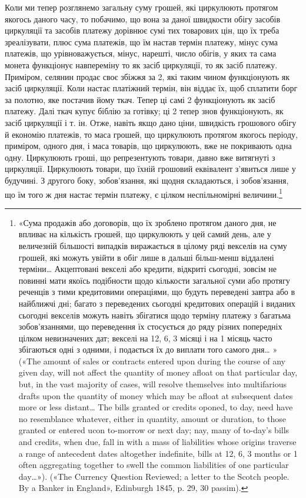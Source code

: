 Коли ми тепер розглянемо загальну суму грошей, які циркулюють протягом якогось даного часу, то
побачимо, що вона за даної швидкости обігу засобів циркуляції та засобів платежу дорівнює сумі тих
товарових цін, що їх треба зреалізувати, плюс сума платежів, що їм настав термін платежу, мінус сума
платежів, що урівноважується, мінус, нарешті, число обігів, у яких та сама монета функціонує
навпереміну то як засіб циркуляції, то як засіб платежу. Приміром, селянин продає своє збіжжя за 2, які таким чином функціонують як засіб циркуляції. Коли настає платіжний термін,
він віддає їх, щоб сплатити борг за полотно, яке постачив йому ткач. Тепер ці самі 2 функціонують як засіб платежу. Далі ткач купує біблію за готівку; ці 2
тепер знов функціонують,
як засіб циркуляції і т. ін. Отже, навіть якщо дано ціни, швидкість грошового обігу й
економію платежів, то маса грошей, що циркулюють протягом якогось періоду, приміром, одного дня, і
маса товарів, що циркулюють, вже не покривають одна одну. Циркулюють гроші, що репрезентують товари,
давно вже витягнуті з циркуляції. Циркулюють товари, що їхній грошовий еквівалент з’явиться лише у
будучині. З другого боку, зобов’язання, які щодня складаються, і зобов’язання, що їм того ж дня
настає термін платежу, є цілком неспільномірні величини.\footnote{
«Сума продажів або договорів, що їх зроблено протягом даного дня, не впливає на кількість
грошей, що циркулюють у цей самий день, але у величезній більшості випадків виражається в цілому
ряді векселів на суму грошей, які можуть увійти в обіг лише в дальші більш-менш віддалені терміни\dots{}
Акцептовані векселі або кредити, відкриті сьогодні, зовсім не повинні мати якоїсь подібности щодо
кількости загальної суми або протягу реченців з тими кредитовими операціями, що будуть переведені
завтра або в найближчі дні; багато з переведених сьогодні кредитових операцій і виданих сьогодні
векселів можуть навіть збігатися щодо терміну платежу з багатьма зобов’язаннями, що переведення їх
стосується до ряду різних попередніх цілком невизначених дат; векселі на 12, 6, 3 місяці і на 1
місяць часто збігаються одні з одними, і подається їх до виплати того самого дня\dots{} » («The amount
of sales or contracts entered upon during the course of any given day, will not affect the quantity
of money afloat on that particular day, but, in the vast majority of cases, will resolve themselves
into multifarious drafts upon the quantity of money which may be afloat at subsequent dates more or
less distant\dots{} The bills granted or credits oponed, to day, need have no resemblance whatever,
either in quantity, amount or duration, to those granted or entered ucon to-morrow or next day; nay,
many of to-day’s bills and credits, when due, fall in with a mass of liabilities whose origins
traverse a range of antecedent dates altogether indefinite, bills at 12, 6, 3 months or 1 often
aggregating together to swell the common liabilities of one particular day\dots{}»). («The Currency
Question Reviewed; a letter to the Scotch people. By a Banker in England», Edinburgh 1845, p. 29, 30
passim).
}

